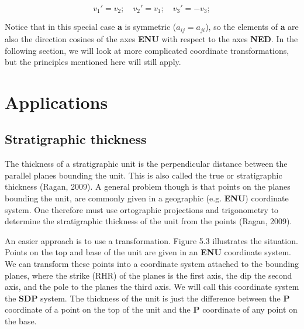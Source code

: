 \documentclass[a4paper , 12pt]{book}
\begin{document}
\begin{equation}
    v_1\text{$'$}=v_2;\quad v_2\text{$'$}=v_1; \quad v_3\text{$'$}=-v_3;
\end{equation}

Notice that in this special case \textbf{a} is symmetric ($a_{ij}=a_{ji}$), so the elements of \textbf{a} are also the direction cosines of the axes \textbf{ENU} with respect to the axes \textbf{NED}. In the following section, we will look at more complicated coordinate transformations, but the principles mentioned here will still apply.

\section{Applications}

\subsection{Stratigraphic thickness}

The thickness of a stratigraphic unit is the perpendicular distance between the parallel planes bounding the unit. This is also called the true or stratigraphic thickness (Ragan, 2009). A general problem though is that points on the planes bounding the unit, are commonly given in a geographic (e.g. \textbf{ENU}) coordinate system. One therefore must use ortographic projections and trigonometry to determine the stratigraphic thickness of the unit from the points (Ragan, 2009).

An easier approach is to use a transformation. Figure 5.3 illustrates the situation. Points on the top and base of the unit are given in an \textbf{ENU} coordinate system. We can transform these points into a coordinate system attached to the bounding planes, where the strike (RHR) of the planes is the first axis, the dip the second axis, and the pole to the planes the third axis. We will call this coordinate system the \textbf{SDP} system. The thickness of the unit is just the difference between the \textbf{P} coordinate of a point on the top of the unit and the \textbf{P} coordinate of any point on the base.
\end{document}
